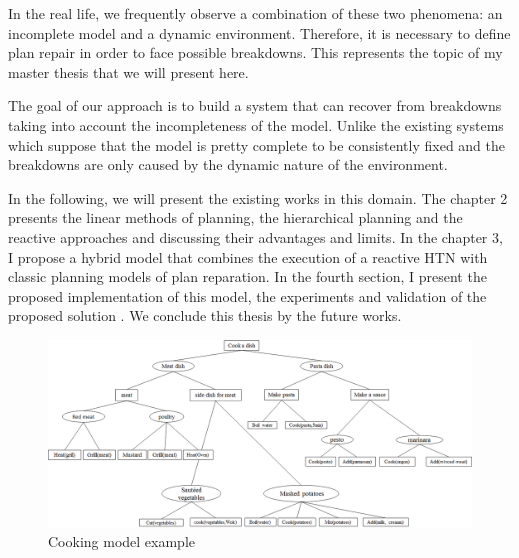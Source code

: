    In the real life, we frequently observe a combination of these two phenomena: an incomplete model and a dynamic environment. Therefore, it is necessary to define plan repair in order to face possible breakdowns. This represents the topic of my master thesis that we will present here.
\par The goal of our approach is to build a system that can recover from breakdowns taking into account the incompleteness of the model. Unlike the existing systems which suppose that the model is pretty complete to be consistently fixed and the breakdowns are only caused by the dynamic nature of the environment. 
\par In the following, we will present the existing works in this domain. The chapter 2 presents the linear methods of planning, the hierarchical planning and the reactive approaches and discussing their advantages and limits. In the chapter 3, I propose a hybrid model that combines the execution of a reactive HTN with classic planning models of plan reparation. In the fourth section, I present the proposed implementation of this model, the experiments and validation of the proposed solution . We conclude this thesis by the future works. 
\begin{figure}[h]
	\centering
	\includegraphics[width=\columnwidth]{Pictures/cooking.png}
	\caption{\label{Cooking model example} Cooking model example}
\end{figure}
